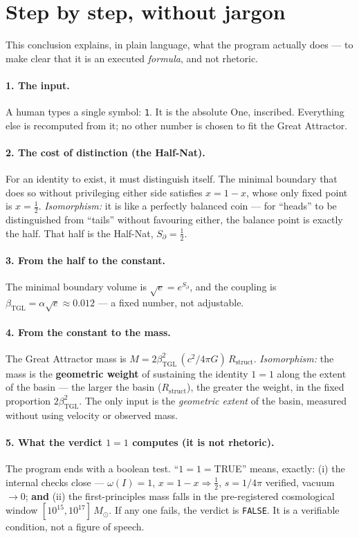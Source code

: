 \documentclass[11pt]{article}
\newcommand{\bTGL}{\beta_{\mathrm{TGL}}}\newcommand{\Msun}{M_{\odot}}\newcommand{\TGL}{\mathrm{TGL}}
\theoremstyle{definition}\newtheorem{deriv}{Derivation}
\begin{document}
\section*{Step by step, without jargon}

This conclusion explains, in plain language, what the program actually does --- to make clear that it is an executed \emph{formula}, and not rhetoric.

\paragraph{1. The input.} A human types a single symbol: \texttt{1}. It is the absolute One, inscribed. Everything else is recomputed from it; no other number is chosen to fit the Great Attractor.

\paragraph{2. The cost of distinction (the Half-Nat).} For an identity to exist, it must distinguish itself. The minimal boundary that does so without privileging either side satisfies $x=1-x$, whose only fixed point is $x=\tfrac12$. \emph{Isomorphism:} it is like a perfectly balanced coin --- for ``heads'' to be distinguished from ``tails'' without favouring either, the balance point is exactly the half. That half is the Half-Nat, $S_\partial=\tfrac12$.

\paragraph{3. From the half to the constant.} The minimal boundary volume is $\sqrt e=e^{S_\partial}$, and the coupling is $\bTGL=\alpha\sqrt e\approx0.012$ --- a fixed number, not adjustable.

\paragraph{4. From the constant to the mass.} The Great Attractor mass is $M=2\bTGL^2\,(c^2/4\pi G)\,R_{\mathrm{struct}}$. \emph{Isomorphism:} the mass is the \textbf{geometric weight} of sustaining the identity $1=1$ along the extent of the basin --- the larger the basin ($R_{\mathrm{struct}}$), the greater the weight, in the fixed proportion $2\bTGL^2$. The only input is the \emph{geometric extent} of the basin, measured without using velocity or observed mass.

\paragraph{5. What the verdict $1=1$ computes (it is not rhetoric).} The program ends with a boolean test. ``$1=1=$TRUE'' means, exactly: (i) the internal checks close --- $\omega(I)=1$, $x=1-x\Rightarrow\tfrac12$, $s=1/4\pi$ verified, vacuum $\to0$; \textbf{and} (ii) the first-principles mass falls in the pre-registered cosmological window $[10^{15},10^{17}]\,\Msun$. If any one fails, the verdict is \texttt{FALSE}. It is a verifiable condition, not a figure of speech.
\end{document}
